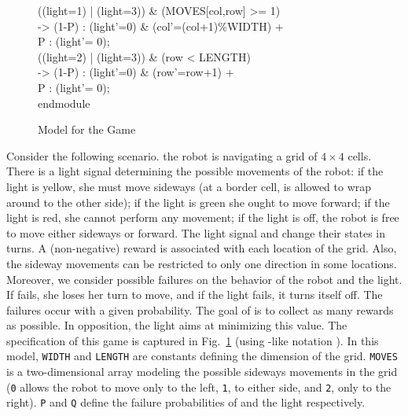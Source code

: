 \begin{figure}
{\begin{tabbing}
\>[r\_r] ((light=1) | (light=3)) \& (MOVES[col,row] >= 1)\\
\>                    \>\>-> \> (1-P) : (light'=0) \& (col'=(col+1)\%WIDTH) + \\
\>                     \>\>\> P : (light'= 0); \\[1ex]
\>[r\_f] ((light=2) | (light=3)) \& (row < LENGTH) \\
\>                    \>\>-> \> (1-P) : (light'=0) \& (row'=row+1)  + \\
\>                     \>\>\> P : (light'= 0);\\[1ex]
endmodule\\[-5ex]
\end{tabbing}}
\caption{Model for the  Game} \label{fig:robot_game_model}
\end{figure}
		Consider the following scenario. \roborta the robot is navigating a grid of $4 \times 4$ cells. There is a light signal  
determining the possible movements of the robot: if the light is yellow, she must move  sideways (at a border cell, \roborta is allowed to wrap around to the other side); if the light is green she ought to move forward; if the light is red, she cannot perform any movement; if the light is off, the robot is free to move either sideways or forward.  The light signal and \roborta change their states in turns.  A (non-negative) reward is associated with each location of the grid.  Also, the sideway movements can be restricted to only one direction in some locations.
Moreover, we consider possible failures on the behavior of the robot and the light. If \roborta fails, she loses her turn to move, and if the light fails, it turns itself off.  The failures occur with a given probability. The goal of \roborta is to collect as many rewards as possible.  In opposition, the light aims at minimizing this value.
The specification of this game is captured in Fig.~\ref{fig:robot_game_model} (using {\Prism}-like notation \cite{DBLP:conf/cav/KwiatkowskaNP11}). 
In this model, \texttt{WIDTH} and \texttt{LENGTH} are constants defining the dimension of the grid.  \texttt{MOVES} is a two-dimensional array modeling the possible sideways movements in the grid (\texttt{0} allows the robot to move only to the left, \texttt{1}, to either side, and \texttt{2}, only to the right).  \texttt{P} and \texttt{Q}  define the failure probabilities of \roborta and the light respectively.
